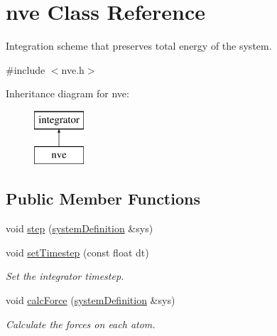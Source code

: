 \hypertarget{classnve}{\section{nve Class Reference}
\label{classnve}
}


Integration scheme that preserves total energy of the system.  




{\ttfamily \#include $<$nve.\-h$>$}

Inheritance diagram for nve\-:\begin{figure}[H]
\begin{center}
\leavevmode
\includegraphics[height=2.000000cm]{classnve}
\end{center}
\end{figure}
\subsection*{Public Member Functions}
\begin{DoxyCompactItemize}
\item 
void \hyperlink{classnve_a4dddd7c0b5978d3d98e6a34e268558e0}{step} (\hyperlink{classsystem_definition}{system\-Definition} \&sys)
\item 
\hypertarget{classintegrator_a493bed6cf5d45fe41a9a6430bd063106}{void \hyperlink{classintegrator_a493bed6cf5d45fe41a9a6430bd063106}{set\-Timestep} (const float dt)}\label{classintegrator_a493bed6cf5d45fe41a9a6430bd063106}

\begin{DoxyCompactList}\small\item\em Set the integrator timestep. \end{DoxyCompactList}\item 
void \hyperlink{classintegrator_ad630bf7c9b7339fa34f36fe43b0d9e3c}{calc\-Force} (\hyperlink{classsystem_definition}{system\-Definition} \&sys)
\begin{DoxyCompactList}\small\item\em Calculate the forces on each atom. \end{DoxyCompactList}\end{DoxyCompactItemize}
